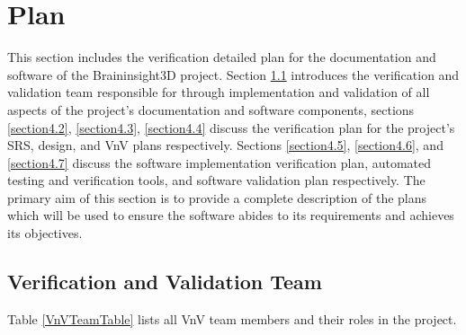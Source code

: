 \documentclass[12pt, titlepage]{article}
\begin{document}



\section{Plan} \label{section4}

This section includes the verification detailed plan for the documentation and
software of the Braininsight3D project. Section \ref{section4.1} introduces the verification and
validation team responsible for through implementation and validation of all aspects of the project's documentation
and software components, sections \ref{section4.2}, \ref{section4.3}, \ref{section4.4} discuss the verification
plan for the project's SRS, design, and VnV plans respectively. Sections \ref{section4.5}, \ref{section4.6}, and
\ref{section4.7} discuss the software implementation verification plan, automated testing and verification tools, and
software validation plan respectively. The primary aim of this section is to provide a complete description
of the plans which will be used to ensure the software abides to its requirements and achieves its objectives.
\subsection{Verification and Validation Team} \label{section4.1}

Table \ref{VnVTeamTable} lists all VnV team members and their roles in the project.
~\newline
\end{document}
